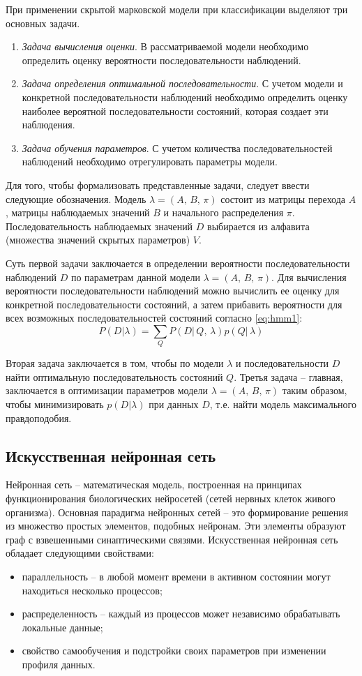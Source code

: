 При применении скрытой марковской модели при классификации выделяют три основных задачи. 
\begin{enumerate}
	\item \textit{Задача вычисления оценки}. В рассматриваемой модели необходимо определить оценку вероятности последовательности наблюдений.
	\item \textit{Задача определения оптимальной последовательности}. С учетом модели и конкретной последовательности наблюдений необходимо определить оценку наиболее вероятной последовательности состояний, которая создает эти 	наблюдения.
	\item \textit{Задача обучения параметров}. С учетом количества последовательностей наблюдений необходимо отрегулировать параметры модели.
\end{enumerate}
Для того, чтобы формализовать представленные задачи, следует ввести следующие обозначения. Модель $\lambda = (A,\,B,\,\pi)$ состоит из матрицы перехода $A$, матрицы наблюдаемых значений $B$ и начального распределения $\pi$. Последовательность наблюдаемых значений $D$ выбирается из алфавита (множества значений скрытых параметров) $V$.

Суть первой задачи заключается в определении вероятности последовательности наблюдений $D$ по параметрам данной модели $\lambda = (A,\,B,\,\pi)$. Для вычисления вероятности последовательности наблюдений можно вычислить ее оценку для конкретной последовательности состояний, а затем прибавить вероятности для всех возможных последовательностей состояний согласно \ref{eq:hmm1}:
\begin{equation}\label{eq:hmm1}
	P(D|\lambda) = \sum_{Q}P(D|\,Q,\,\lambda)p(Q|\,\lambda)
\end{equation}

Вторая задача заключается в том, чтобы по модели $\lambda$ и последовательности $D$ найти оптимальную последовательность состояний $Q$. Третья задача -- главная, заключается в оптимизации параметров модели $\lambda = (A,\,B,\,\pi)$ таким образом, чтобы минимизировать $p(D|\lambda)$ при данных $D$, т.е. найти модель максимального правдоподобия. 

\subsection{Искусственная нейронная сеть}
Нейронная сеть -- математическая модель, построенная на принципах функционирования биологических нейросетей (сетей нервных клеток живого организма). \cite{nl} Основная парадигма нейронных сетей -- это формирование решения из множество простых элементов, подобных нейронам. Эти элементы образуют граф с взвешенными синаптическими связями. Искусственная нейронная сеть обладает следующими свойствами: \cite{dukeNL}
\begin{itemize}
	\item параллельность -- в любой момент времени в активном состоянии могут находиться несколько процессов;
	\item распределенность -- каждый из процессов может независимо обрабатывать локальные данные;
	\item свойство самообучения и подстройки своих параметров при изменении профиля данных.
\end{itemize}

